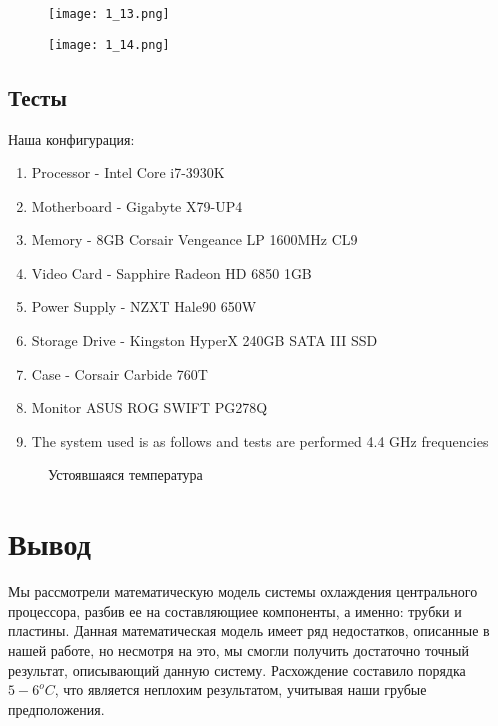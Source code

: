 \documentclass[a4paper]{article}
\begin{document}
\begin{figure}[H]
\begin{center}
\begin{minipage}[h]{0.4\linewidth}
\texttt{[image: 1\_13.png]}
\caption{} %
\label{ris:experimoriginal}
\end{minipage}
\hfill
\begin{minipage}[h]{0.4\linewidth}
\texttt{[image: 1\_14.png]}
\caption{}
\label{ris:experimcoded}
\end{minipage}
\end{center}
\end{figure}

\subsection{Тесты}

Наша конфигурация:

\begin{enumerate}
    \item Processor - Intel Core i7-3930K
    \item Motherboard - Gigabyte X79-UP4
    \item Memory - 8GB Corsair Vengeance LP 1600MHz CL9
    \item Video Card - Sapphire Radeon HD 6850 1GB
    \item Power Supply - NZXT Hale90 650W
    \item Storage Drive - Kingston HyperX 240GB SATA III SSD
    \item Case - Corsair Carbide 760T
    \item Monitor ASUS ROG SWIFT PG278Q
    \item The system used is as follows and tests are performed 4.4 GHz frequencies
\end{enumerate}

\begin{figure}[H]
\caption{Устоявшаяся температура}
\label{ris:image}
\end{figure}

\newpage
\section{Вывод}

Мы рассмотрели математическую модель системы охлаждения центрального процессора, разбив ее на составляющиее компоненты, а именно: трубки и пластины. Данная математическая модель имеет ряд недостатков, описанные в нашей работе, но несмотря на это, мы смогли получить достаточно точный результат, описывающий данную систему. Расхождение составило порядка $5-6^oC$, что является неплохим результатом, учитывая наши грубые предположения.
\end{document}
